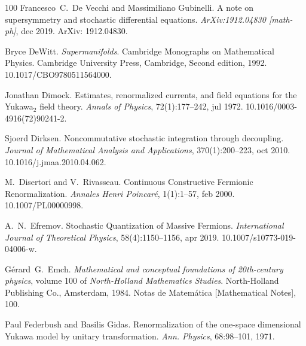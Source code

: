 \documentclass{article}
\newcommand{\tmrsub}[1]{\ensuremath{_{\textrm{#1}}}}
\newcommand{\tmtextit}[1]{{\itshape{#1}}}
\begin{document}
\begin{thebibliography}{100}
  Francesco~C.~De Vecchi  and  Massimiliano
  Gubinelli. {\newblock}A note on supersymmetry and stochastic differential
  equations. {\newblock}\tmtextit{ArXiv:1912.04830 [math-ph]}, dec 2019.
  {\newblock}ArXiv: 1912.04830.{\newblock}
  
  Bryce DeWitt. {\newblock}\tmtextit{Supermanifolds}.
  {\newblock}Cambridge Monographs on Mathematical Physics. Cambridge
  University Press, Cambridge, Second  edition, 1992.
  {\newblock}\href{Https://doi.org/10.1017/CBO9780511564000}{}10.1017/CBO9780511564000.{\newblock}
  
  Jonathan Dimock. {\newblock}Estimates,
  renormalized currents, and field equations for the Yukawa\tmrsub{$2$} field
  theory. {\newblock}\tmtextit{Annals of Physics}, 72(1):177--242, jul 1972.
  {\newblock}\href{Https://doi.org/10.1016/0003-4916(72)90241-2}{}10.1016/0003-4916(72)90241-2.{\newblock}
  
  Sjoerd Dirksen.
  {\newblock}Noncommutative stochastic integration through decoupling.
  {\newblock}\tmtextit{Journal of Mathematical Analysis and Applications},
  370(1):200--223, oct 2010.
  {\newblock}\href{Https://doi.org/10.1016/j.jmaa.2010.04.062}{}10.1016/j.jmaa.2010.04.062.{\newblock}
  
  M.~Disertori  and  V.~Rivasseau.
  {\newblock}Continuous Constructive Fermionic Renormalization.
  {\newblock}\tmtextit{Annales Henri Poincar{\'e}}, 1(1):1--57, feb 2000.
  {\newblock}\href{Https://doi.org/10.1007/PL00000998}{}10.1007/PL00000998.{\newblock}
  
  A.~N.~Efremov. {\newblock}Stochastic
  Quantization of Massive Fermions. {\newblock}\tmtextit{International Journal
  of Theoretical Physics}, 58(4):1150--1156, apr 2019.
  {\newblock}\href{Https://doi.org/10.1007/s10773-019-04006-w}{}10.1007/s10773-019-04006-w.{\newblock}
  
  G{\'e}rard~G.~Emch. {\newblock}\tmtextit{Mathematical and
  conceptual foundations of 20th-century physics},  volume  100  of
  \tmtextit{North-Holland Mathematics Studies}. {\newblock}North-Holland
  Publishing Co., Amsterdam, 1984. {\newblock}Notas de Matem{\'a}tica
  [Mathematical Notes], 100.{\newblock}
  
  Paul Federbush  and  Basilis Gidas.
  {\newblock}Renormalization of the one-space dimensional Yukawa model by
  unitary transformation. {\newblock}\tmtextit{Ann. Physics}, 68:98--101,
  1971.{\newblock}
  

\end{thebibliography}
\end{document}
